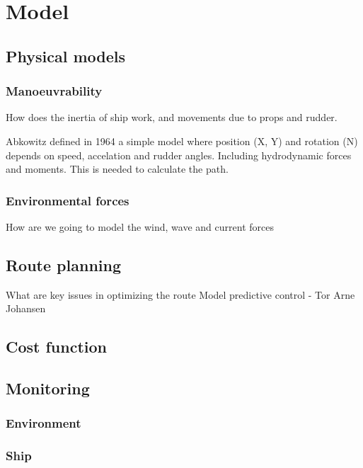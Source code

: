 \section{Model}

\subsection{Physical models}

\subsubsection{Manoeuvrability}
How does the inertia of ship work, and movements due to props and rudder.

Abkowitz defined in 1964 a simple model where position (X, Y) and rotation (N) depends on speed, accelation and rudder angles. Including hydrodynamic forces and moments. This is needed to calculate the path. 

\subsubsection{Environmental forces}
How are we going to model the wind, wave and current forces

\subsection{Route planning}
What are key issues in optimizing the route
Model predictive control - Tor Arne Johansen

\subsection{Cost function}

\subsection{Monitoring}
\subsubsection{Environment}

\subsubsection{Ship}